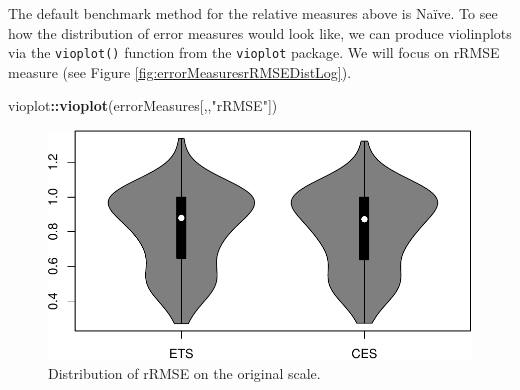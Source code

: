 \documentclass[]{book}
\newenvironment{Shaded}{\begin{snugshade}}{\end{snugshade}}
\newcommand{\CommentTok}[1]{\textcolor[rgb]{0.56,0.35,0.01}{\textit{#1}}}
\newcommand{\DataTypeTok}[1]{\textcolor[rgb]{0.13,0.29,0.53}{#1}}
\newcommand{\DecValTok}[1]{\textcolor[rgb]{0.00,0.00,0.81}{#1}}
\newcommand{\KeywordTok}[1]{\textcolor[rgb]{0.13,0.29,0.53}{\textbf{#1}}}
\newcommand{\NormalTok}[1]{#1}
\newcommand{\OperatorTok}[1]{\textcolor[rgb]{0.81,0.36,0.00}{\textbf{#1}}}
\newcommand{\OtherTok}[1]{\textcolor[rgb]{0.56,0.35,0.01}{#1}}
\newcommand{\StringTok}[1]{\textcolor[rgb]{0.31,0.60,0.02}{#1}}
\theoremstyle{definition}
\theoremstyle{definition}
\theoremstyle{definition}
\theoremstyle{definition}
\theoremstyle{remark}
\begin{document}
\begin{Shaded}
\end{Shaded}

The default benchmark method for the relative measures above is Naïve. To see how the distribution of error measures would look like, we can produce violinplots via the \texttt{vioplot()} function from the \texttt{vioplot} package. We will focus on rRMSE measure (see Figure \ref{fig:errorMeasuresrRMSEDistLog}).

\begin{Shaded}
\begin{Highlighting}[]
\NormalTok{vioplot}\OperatorTok{::}\KeywordTok{vioplot}\NormalTok{(errorMeasures[,,}\StringTok{"rRMSE"}\NormalTok{])}
\end{Highlighting}
\end{Shaded}

\begin{figure}
\centering
\includegraphics{Svetunkov--2022----ADAM_files/figure-latex/errorMeasuresrRMSEDist-1.pdf}
\caption{\label{fig:errorMeasuresrRMSEDist}Distribution of rRMSE on the original scale.}
\end{figure}
\end{document}
